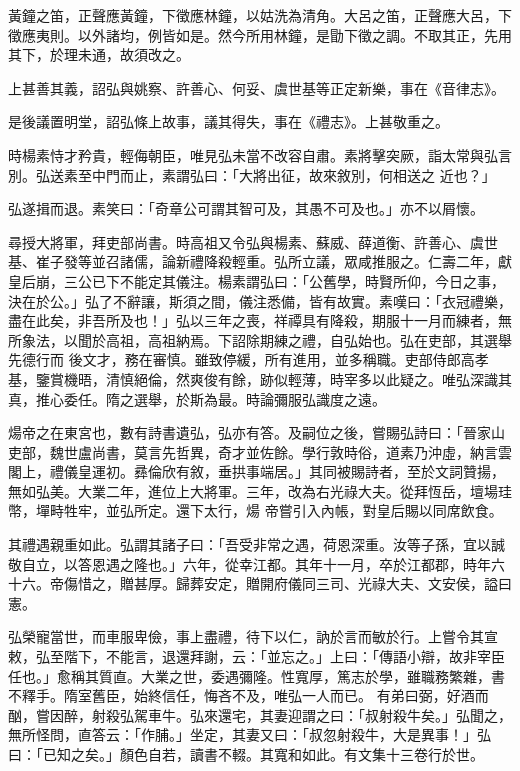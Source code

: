\begin{pinyinscope}
 黃鐘之笛，正聲應黃鐘，下徵應林鐘，以姑洗為清角。大呂之笛，正聲應大呂，下徵應夷則。以外諸均，例皆如是。然今所用林鐘，是勖下徵之調。不取其正，先用其下，於理未通，故須改之。



 上甚善其義，詔弘與姚察、許善心、何妥、虞世基等正定新樂，事在《音律志》。



 是後議置明堂，詔弘條上故事，議其得失，事在《禮志》。上甚敬重之。



 時楊素恃才矜貴，輕侮朝臣，唯見弘未當不改容自肅。素將擊突厥，詣太常與弘言別。弘送素至中門而止，素謂弘曰：「大將出征，故來敘別，何相送之
 近也？」



 弘遂揖而退。素笑曰：「奇章公可謂其智可及，其愚不可及也。」亦不以屑懷。



 尋授大將軍，拜吏部尚書。時高祖又令弘與楊素、蘇威、薛道衡、許善心、虞世基、崔子發等並召諸儒，論新禮降殺輕重。弘所立議，眾咸推服之。仁壽二年，獻皇后崩，三公已下不能定其儀注。楊素謂弘曰：「公舊學，時賢所仰，今日之事，決在於公。」弘了不辭讓，斯須之間，儀注悉備，皆有故實。素嘆曰：「衣冠禮樂，盡在此矣，非吾所及也！」弘以三年之喪，祥禫具有降殺，期服十一月而練者，無所象法，以聞於高祖，高祖納焉。下詔除期練之禮，自弘始也。弘在吏部，其選舉先德行而
 後文才，務在審慎。雖致停緩，所有進用，並多稱職。吏部侍郎高孝基，鑒賞機晤，清慎絕倫，然爽俊有餘，跡似輕薄，時宰多以此疑之。唯弘深識其真，推心委任。隋之選舉，於斯為最。時論彌服弘識度之遠。



 煬帝之在東宮也，數有詩書遺弘，弘亦有答。及嗣位之後，嘗賜弘詩曰：「晉家山吏部，魏世盧尚書，莫言先哲異，奇才並佐餘。學行敦時俗，道素乃沖虛，納言雲閣上，禮儀皇運初。彞倫欣有敘，垂拱事端居。」其同被賜詩者，至於文詞贊揚，無如弘美。大業二年，進位上大將軍。三年，改為右光祿大夫。從拜恆岳，壇場珪幣，墠畤牲牢，並弘所定。還下太行，煬
 帝嘗引入內帳，對皇后賜以同席飲食。



 其禮遇親重如此。弘謂其諸子曰：「吾受非常之遇，荷恩深重。汝等子孫，宜以誠敬自立，以答恩遇之隆也。」六年，從幸江都。其年十一月，卒於江都郡，時年六十六。帝傷惜之，贈甚厚。歸葬安定，贈開府儀同三司、光祿大夫、文安侯，謚曰憲。



 弘榮寵當世，而車服卑儉，事上盡禮，待下以仁，訥於言而敏於行。上嘗令其宣敕，弘至階下，不能言，退還拜謝，云：「並忘之。」上曰：「傳語小辯，故非宰臣任也。」愈稱其質直。大業之世，委遇彌隆。性寬厚，篤志於學，雖職務繁雜，書不釋手。隋室舊臣，始終信任，悔吝不及，唯弘一人而已。
 有弟曰弼，好酒而酗，嘗因醉，射殺弘駕車牛。弘來還宅，其妻迎謂之曰：「叔射殺牛矣。」弘聞之，無所怪問，直答云：「作脯。」坐定，其妻又曰：「叔忽射殺牛，大是異事！」弘曰：「已知之矣。」顏色自若，讀書不輟。其寬和如此。有文集十三卷行於世。




\end{pinyinscope}
